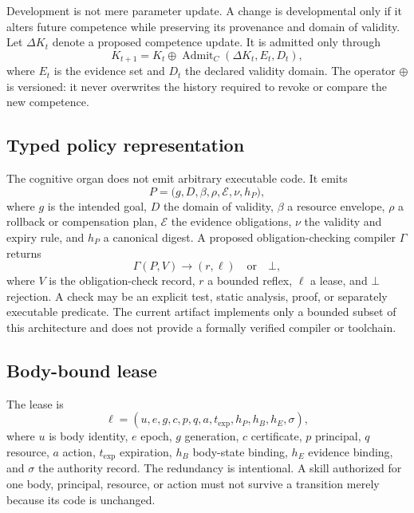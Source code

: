 \documentclass[journal,10pt]{IEEEtran}
\begin{document}
Development is not mere parameter update. A change is developmental only if it alters future competence while preserving its provenance and domain of validity. Let $\Delta K_t$ denote a proposed competence update. It is admitted only through
\begin{equation}
  K_{t+1}=K_t\oplus\operatorname{Admit}_C(\Delta K_t,E_t,D_t), \label{eq:development}
\end{equation}
where $E_t$ is the evidence set and $D_t$ the declared validity domain. The operator $\oplus$ is versioned: it never overwrites the history required to revoke or compare the new competence.

\subsection{Typed policy representation}
The cognitive organ does not emit arbitrary executable code. It emits
\begin{equation}
  P=\bigl(g,D,\beta,\rho,\mathcal E,\nu,h_P\bigr), \label{eq:policyir}
\end{equation}
where $g$ is the intended goal, $D$ the domain of validity, $\beta$ a resource envelope, $\rho$ a rollback or compensation plan, $\mathcal E$ the evidence obligations, $\nu$ the validity and expiry rule, and $h_P$ a canonical digest. A proposed obligation-checking compiler $\Gamma$ returns
\begin{equation}
  \Gamma(P,V)\rightarrow (r,\ell) \quad \text{or} \quad \bot, \label{eq:compile}
\end{equation}
where $V$ is the obligation-check record, $r$ a bounded reflex, $\ell$ a lease, and $\bot$ rejection. A check may be an explicit test, static analysis, proof, or separately executable predicate. The current artifact implements only a bounded subset of this architecture and does not provide a formally verified compiler or toolchain.

\subsection{Body-bound lease}
The lease is
\begin{equation}
\ell = (u,e,g,c,p,q,a,t_{\mathrm{exp}},h_P,h_B,h_E,\sigma), \label{eq:lease}
\end{equation}
where $u$ is body identity, $e$ epoch, $g$ generation, $c$ certificate, $p$ principal, $q$ resource, $a$ action, $t_{\mathrm{exp}}$ expiration, $h_B$ body-state binding, $h_E$ evidence binding, and $\sigma$ the authority record. The redundancy is intentional. A skill authorized for one body, principal, resource, or action must not survive a transition merely because its code is unchanged.
\end{document}
